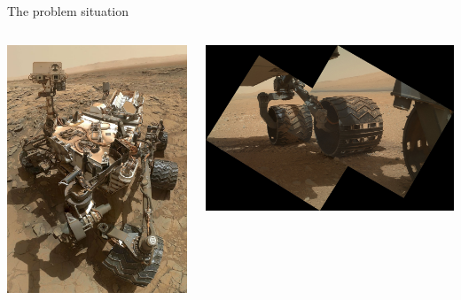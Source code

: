 \documentclass[presentation,aspectratio=169, usenames, dvipsnames]{beamer}
\begin{document}
\begin{frame}[label={sec:orga9b24dc}]{The problem situation}
\begin{columns}
\begin{column}{0.4\columnwidth}
\begin{center}
  \includegraphics[width=.94\linewidth]{../../figures/mars-rover-curiosity-vehicle-cosmos.jpg}
\end{center}
\end{column}

\begin{column}{0.6\columnwidth}
\begin{center}
  \includegraphics[width=.94\linewidth]{../../figures/mars.nasa.jpeg}
\end{center}



\end{column}
\end{columns}
\end{frame}
\end{document}
